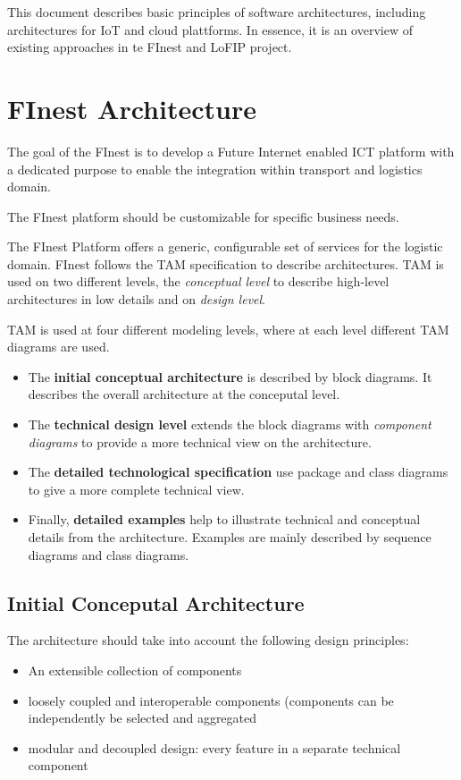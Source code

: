 
This document describes basic principles of software architectures,
including architectures for IoT and cloud plattforms.
In essence, it is an overview of existing approaches in te FInest
and LoFIP project.


\section{FInest Architecture}

The goal of the FInest is to develop a Future Internet enabled ICT platform with a dedicated
purpose to enable the integration within transport and logistics domain.

The FInest platform should be customizable for specific business needs.

The FInest Platform offers a generic, configurable set of services
for the logistic domain.
FInest follows the TAM specification to describe architectures.
TAM is used on two different levels, the \emph{conceptual level} to describe
high-level architectures in low details and on \emph{design level}.

TAM is used at four different modeling levels, where at each level different
TAM diagrams are used.

\begin{itemize}
	\item The \textbf{initial conceptual architecture} is described by block diagrams.
	   It describes the overall architecture at the conceputal level.
	\item The \textbf{technical design level} extends the block diagrams with \emph{component diagrams}
	    to provide a more technical view on the architecture.
	\item The \textbf{detailed technological specification} use package and class diagrams
	      to give a more complete technical view.
	 \item Finally, \textbf{detailed examples} help to illustrate technical and conceptual details from 
	       the architecture. Examples are mainly described by sequence diagrams and class diagrams.
\end{itemize}
 

\subsection{Initial Conceputal Architecture}

The architecture should take into account the following design principles:
\begin{itemize}
	\item An extensible collection of components
	\item loosely coupled and interoperable components (components can be independently be selected and aggregated
	\item modular and decoupled design: every feature in a separate technical component
\end{itemize}


